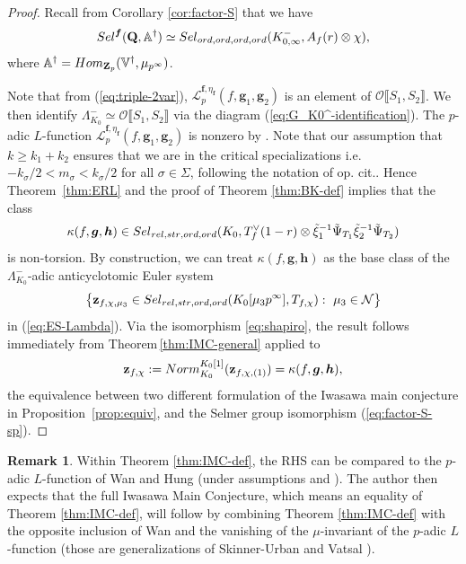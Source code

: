 \documentclass[10pt,letterpaper]{amsart}
\theoremstyle{plain}
\theoremstyle{definition}
\newtheorem{rmk}[thm]{Remark}
\theoremstyle{definition}
\theoremstyle{plain}
\theoremstyle{plain}
\theoremstyle{plain}
\theoremstyle{remark}
\numberwithin{equation}{section}
\newcommand{\ch}{\xi}
\newcommand{\relstr}{{{\rm rel},{\rm str}}}
\newcommand{\ord}{{{\rm ord},{\rm ord}}}
\def\cO{\mathcal O}
\newcommand{\unb}{{\boldsymbol{f}}}
\newcommand{\Q}{\mathbf{Q}}
\newcommand{\Z}{\mathbf{Z}}
\newcommand{\dBr}[1]{\llbracket{#1}\rrbracket}
\newcommand{\bff}{{\boldsymbol{f}}}
\newcommand{\bfg}{{\boldsymbol{g}}}
\newcommand{\bfh}{{\boldsymbol{h}}}
\begin{document}
\begin{proof}
Recall from Corollary \ref{cor:factor-S} that we have
\begin{equation}\label{eq:factor-S-sp}
{\rm Sel}^\bff(\Q,\mathbb{A}^\dagger)\simeq{\rm Sel}_{\ord,\ord}(K_{0,\infty}^-,A_f(r)\otimes\chi),
\end{equation}
where $\mathbb{A}^\dagger={\rm Hom}_{\Z_p}(\mathbb{V}^\dagger,\mu_{p^\infty})$. 

Note that from (\ref{eq:triple-2var}), 
$\mathscr{L}_p^{\unb,\eta_\bff}(f,\bfg_1,\bfg_2)$ is an element of $\cO\dBr{S_1,S_2}$. We then identify $\Lambda_{K_0}^-\simeq\cO\dBr{S_1,S_2}$ via the diagram (\ref{eq:G_K0^-identification}). The $p$-adic $L$-function $\mathscr{L}_p^{\unb,\eta_\bff}(f,\bfg_1,\bfg_2)$ is nonzero by \cite[Thm.\,C]{hung}. Note that our assumption that $k\ge k_1+k_2$ ensures that we are in the critical specializations i.e. $-k_{\sigma}/2< m_\sigma < k_{\sigma}/2$ for all $\sigma\in \Sigma$, following the notation of op. cit.. Hence  Theorem~\ref{thm:ERL} and the proof of Theorem \ref{thm:BK-def} implies that the class
\begin{equation}
\kappa(f,\bfg,\bfh)\in{\rm Sel}_{\relstr,\ord}(K_0,T_f^{\vee}(1-r)\otimes\tilde{\ch}_1^{-1}\tilde{\Psi}_{T_1}\tilde{\ch}_2^{-1}\tilde{\Psi}_{T_2})\nonumber
\end{equation}
is non-torsion. By construction, we can treat $\kappa(f,\bfg,\bfh)$ as the base class of the $\Lambda_{K_0}^-$-adic anticyclotomic Euler system 
\[
\bigl\{\mathbf{z}_{f,\chi,\mu_3}\in{\rm Sel}_{\relstr,\ord}(K_0[\mu_3p^\infty],T_{f,\chi})\,\colon\;\mu_3\in\mathcal{N}\bigr\}
\]
in (\ref{eq:ES-Lambda}). Via the isomorphism \ref{eq:shapiro}, the result follows immediately from
Theorem\,\ref{thm:IMC-general} applied to
\begin{equation}\label{eq:Lambda-class}
\mathbf{z}_{f,\chi}:={\rm Norm}^{K_0[1]}_{K_0}(\mathbf{z}_{f,\chi,(1)})=\kappa(f,\bfg,\bfh),
\end{equation}
the equivalence between two different formulation of the Iwasawa main conjecture in Proposition~\ref{prop:equiv}, and the Selmer group isomorphism  (\ref{eq:factor-S-sp}). 
\end{proof}


\begin{rmk}
Within Theorem \ref{thm:IMC-def}, the RHS can be compared to the $p$-adic $L$-function of Wan \cite[Thm.\,86]{wan_hilbertIMC} and Hung \cite{hung} (under assumptions \cite[Thm.\,11.1,11.2]{Fujiwara} and \cite[Thm.\,103]{wan_hilbertIMC}). The author then expects that the full Iwasawa Main Conjecture, which means an equality of Theorem \ref{thm:IMC-def}, will follow by combining Theorem \ref{thm:IMC-def} with the opposite inclusion of Wan \cite{wan_hilbertIMC} and the vanishing of the
$\mu$-invariant of the $p$-adic $L$-function \cite{hung} (those are generalizations of Skinner-Urban \cite{SU} and Vatsal \cite{vatsal-special}).
\end{rmk}
\end{document}
